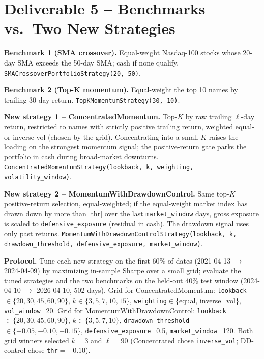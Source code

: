 \documentclass[11pt]{article}
\begin{document}
\section{Deliverable 5 -- Benchmarks vs.\ Two New Strategies}

\textbf{Benchmark 1 (SMA crossover).} Equal-weight Nasdaq-100 stocks
whose 20-day SMA exceeds the 50-day SMA; cash if none qualify.
\texttt{SMACrossoverPortfolioStrategy(20, 50)}.

\textbf{Benchmark 2 (Top-K momentum).} Equal-weight the top 10 names
by trailing 30-day return. \texttt{TopKMomentumStrategy(30, 10)}.

\textbf{New strategy 1 -- ConcentratedMomentum.} Top-$K$ by raw trailing
$\ell$-day return, restricted to names with strictly positive trailing
return, weighted equal- or inverse-vol (chosen by the grid). Concentrating
into a small $K$ raises the loading on the strongest momentum signal; the
positive-return gate parks the portfolio in cash during broad-market
downturns. \texttt{ConcentratedMomentumStrategy(lookback, k, weighting,
volatility\_window)}.

\textbf{New strategy 2 -- MomentumWithDrawdownControl.} Same top-$K$
positive-return selection, equal-weighted; if the equal-weight market
index has drawn down by more than $|\text{thr}|$ over the last
\texttt{market\_window} days, gross exposure is scaled to
\texttt{defensive\_exposure} (residual in cash). The drawdown signal
uses only past returns.
\texttt{MomentumWithDrawdownControlStrategy(lookback, k,
drawdown\_threshold, defensive\_exposure, market\_window)}.

\textbf{Protocol.} Tune each new strategy on the first 60\% of dates
(2021-04-13 $\to$ 2024-04-09) by maximizing in-sample Sharpe over a
small grid; evaluate the tuned strategies and the two benchmarks on the
held-out 40\% test window (2024-04-10 $\to$ 2026-04-10, 502 days).
Grid for ConcentratedMomentum:
\texttt{lookback}$\in\{20,30,45,60,90\}$, $k\in\{3,5,7,10,15\}$,
\texttt{weighting}$\in$\{equal, inverse\_vol\}, \texttt{vol\_window}=20.
Grid for MomentumWithDrawdownControl:
\texttt{lookback}$\in\{20,30,45,60,90\}$, $k\in\{3,5,7,10\}$,
\texttt{drawdown\_threshold}$\in\{-0.05,-0.10,-0.15\}$,
\texttt{defensive\_exposure}=0.5, \texttt{market\_window}=120. Both grid
winners selected $k=3$ and $\ell=90$ (Concentrated chose
\texttt{inverse\_vol}; DD-control chose \texttt{thr}$=-0.10$).
\end{document}
